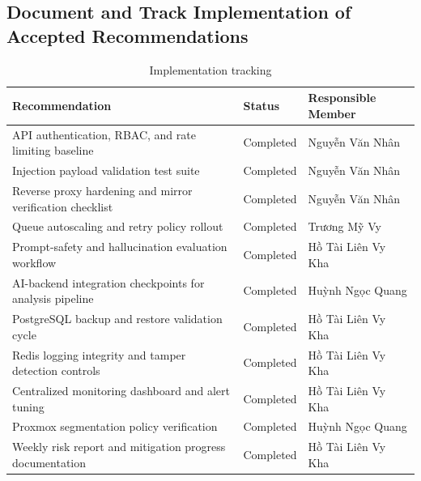 \subsection{Document and Track Implementation of Accepted Recommendations}
\begin{table}[H]
    \centering
    \renewcommand{\arraystretch}{1.2}
    \begin{tabularx}{\textwidth}{|X|X|X|}
        \hline
        \textbf{Recommendation} & \textbf{Status} & \textbf{Responsible Member} \\
        \hline
        API authentication, RBAC, and rate limiting baseline & Completed & Nguyễn Văn Nhân \\
        \hline
        Injection payload validation test suite & Completed & Nguyễn Văn Nhân \\
        \hline
        Reverse proxy hardening and mirror verification checklist & Completed & Nguyễn Văn Nhân \\
        \hline
        Queue autoscaling and retry policy rollout & Completed & Trương Mỹ Vy \\
        \hline
        Prompt-safety and hallucination evaluation workflow & Completed & Hồ Tài Liên Vy Kha \\
        \hline
        AI-backend integration checkpoints for analysis pipeline & Completed & Huỳnh Ngọc Quang \\
        \hline
        PostgreSQL backup and restore validation cycle & Completed & Hồ Tài Liên Vy Kha \\
        \hline
        Redis logging integrity and tamper detection controls & Completed & Hồ Tài Liên Vy Kha \\
        \hline
        Centralized monitoring dashboard and alert tuning & Completed & Hồ Tài Liên Vy Kha \\
        \hline
        Proxmox segmentation policy verification & Completed & Huỳnh Ngọc Quang \\
        \hline
        Weekly risk report and mitigation progress documentation & Completed & Hồ Tài Liên Vy Kha \\
        \hline
    \end{tabularx}
    \caption{Implementation tracking}
\end{table}

